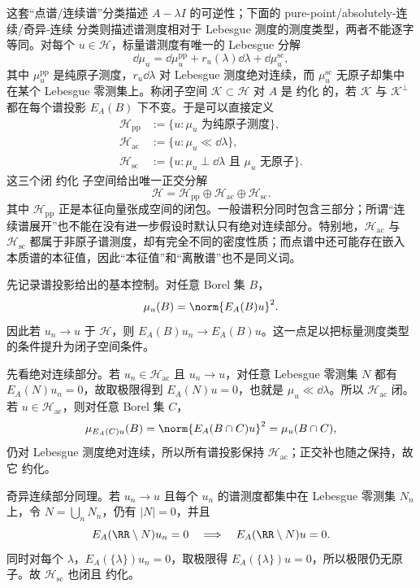 这套“点谱/连续谱”分类描述 $A-\lambda I$ 的可逆性；下面的 pure-point/absolutely-连续/奇异-连续 分类则描述谱测度相对于 Lebesgue 测度的测度类型，两者不能逐字等同。对每个 $u\in\mathcal H$，标量谱测度有唯一的 Lebesgue 分解
\[
 \dd\mu_u
 =\dd\mu_u^{\mathrm{pp}}
 +r_u(\lambda)\dd\lambda
 +\dd\mu_u^{\mathrm{sc}},
\]
其中 $\mu_u^{\mathrm{pp}}$ 是纯原子测度，$r_u\dd\lambda$ 对 Lebesgue 测度绝对连续，而 $\mu_u^{\mathrm{sc}}$ 无原子却集中在某个 Lebesgue 零测集上。称闭子空间 $\mathcal K\subset\mathcal H$ 对 $A$ 是 约化 的，若 $\mathcal K$ 与 $\mathcal K^\perp$ 都在每个谱投影 $E_A(B)$ 下不变。于是可以直接定义
\[
\begin{aligned}
 \mathcal H_{\mathrm{pp}}&:=\{u:\mu_u\text{ 为纯原子测度}\},\\
 \mathcal H_{\mathrm{ac}}&:=\{u:\mu_u\ll\dd\lambda\},\\
 \mathcal H_{\mathrm{sc}}&:=\{u:\mu_u\perp\dd\lambda\text{ 且 }\mu_u\text{ 无原子}\}.
\end{aligned}
\]
这三个闭 约化 子空间给出唯一正交分解
\[
 \mathcal H=\mathcal H_{\mathrm{pp}}\oplus\mathcal H_{\mathrm{ac}}\oplus\mathcal H_{\mathrm{sc}}.
\]
其中 $\mathcal H_{\mathrm{pp}}$ 正是本征向量张成空间的闭包。一般谱积分同时包含三部分；所谓“连续谱展开”也不能在没有进一步假设时默认只有绝对连续部分。特别地，$\mathcal H_{\mathrm{ac}}$ 与 $\mathcal H_{\mathrm{sc}}$ 都属于非原子谱测度，却有完全不同的密度性质；而点谱中还可能存在嵌入本质谱的本征值，因此“本征值”和“离散谱”也不是同义词。

先记录谱投影给出的基本控制。对任意 Borel 集 $B$，
\[
 \mu_u(B)=\norm{E_A(B)u}^2.
\]
因此若 $u_n\to u$ 于 $\mathcal H$，则
$E_A(B)u_n\to E_A(B)u$。这一点足以把标量测度类型的条件提升为闭子空间条件。

先看绝对连续部分。若 $u_n\in\mathcal H_{\mathrm{ac}}$ 且 $u_n\to u$，对任意 Lebesgue 零测集 $N$ 都有
$E_A(N)u_n=0$，故取极限得到 $E_A(N)u=0$，也就是 $\mu_u\ll\dd\lambda$。所以 $\mathcal H_{\mathrm{ac}}$ 闭。若 $u\in\mathcal H_{\mathrm{ac}}$，则对任意 Borel 集 $C$，
\[
 \mu_{E_A(C)u}(B)
 =\norm{E_A(B\cap C)u}^2
 =\mu_u(B\cap C),
\]
仍对 Lebesgue 测度绝对连续，所以所有谱投影保持 $\mathcal H_{\mathrm{ac}}$；正交补也随之保持，故它 约化。

奇异连续部分同理。若 $u_n\to u$ 且每个 $u_n$ 的谱测度都集中在 Lebesgue 零测集 $N_n$ 上，令
$N=\bigcup_nN_n$，仍有 $|N|=0$，并且
\[
 E_A(\RR\setminus N)u_n=0
 \quad\Longrightarrow\quad
 E_A(\RR\setminus N)u=0.
\]
同时对每个 $\lambda$，$E_A(\{\lambda\})u_n=0$，取极限得
$E_A(\{\lambda\})u=0$，所以极限仍无原子。故 $\mathcal H_{\mathrm{sc}}$ 也闭且 约化。

